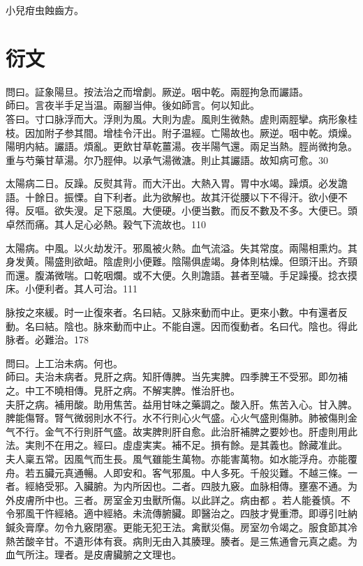 小兒疳虫蝕齒方。


\part{衍文}

問曰。証象陽旦。按法治之而增劇。厥逆。咽中乾。兩脛拘急而讝語。\\
師曰。言夜半手足当温。兩腳当伸。後如師言。何以知此。\\
答曰。寸口脉浮而大。浮{\khaaitp 則}为風。大{\khaaitp 則}为虗。風則生微熱。虗則兩脛攣。病形象桂枝。因加附子参其間。增桂令汗出。附子温經。亡陽故也。厥逆。咽中乾。煩燥。陽明内結。讝語。煩亂。更飲甘草乾薑湯。夜半陽气還。兩足当熱。脛尚微拘急。重与芍藥甘草湯。尔乃脛伸。以承气湯微溏。則止其讝語。故知病可愈。30

太陽病二日。反躁。反熨其背。而大汗出。大熱入胃。胃中水竭。躁煩。必发譫語。十餘日。振慄。自下利者。此为欲解也。故其汗從腰以下不得汗。欲小便不得。反嘔。欲失溲。足下惡風。大便硬。小便当數。而反不數及不多。大便已。頭卓然而痛。其人足心必熱。穀气下流故也。110

太陽病。中風。以火劫发汗。邪風被火熱。血气流溢。失其常度。兩陽相熏灼。其身发黄。陽盛則欲衄。陰虗{\khaaitp 則}小便難。陰陽俱虗竭。身体則枯燥。但頭汗出。齐頸而還。腹滿微喘。口乾咽爛。或不大便。久則譫語。甚者至噦。手足躁擾。捻衣摸床。小便利者。其人可治。111

脉按之來緩。时一止復來者。名曰結。又脉來動而中止。更來小數。中有還者反動。名曰結。陰也。脉來動而中止。不能自還。因而復動者。名曰代。陰也。得此脉者。必難治。178

問曰。上工治未病。何也。\\
師曰。夫治未病者。見肝之病。知肝傳脾。当先実脾。四季脾王不受邪。即勿補之。中工不曉相傳。見肝之病。不解実脾。惟治肝也。\\
夫肝之病。補用酸。助用焦苦。益用甘味之藥調之。酸入肝。焦苦入心。甘入脾。脾能傷腎。腎气微弱則水不行。水不行則心火气盛。心火气盛則傷肺。肺被傷則金气不行。金气不行則肝气盛。故実脾則肝自愈。此治肝補脾之要妙也。肝虛則用此法。実則不在用之。經曰。虛虛実実。補不足。損有餘。是其義也。餘藏准此。\\
夫人稟五常。因風气而生長。風气雖能生萬物。亦能害萬物。如水能浮舟。亦能覆舟。若五臟元真通暢。人即安和。客气邪風。中人多死。千般災難。不越三條。一者。經絡受邪。入臟腑。为内所因也。二者。四肢九竅。血脉相傳。壅塞不通。为外皮膚所中也。三者。房室金刃虫獸所傷。以此詳之。病由都{\sungtpii 𥁞}。若人能養慎。不令邪風干忤經絡。適中經絡。未流傳腑臟。即醫治之。四肢才覺重滯。即導引吐納鍼灸膏摩。勿令九竅閉塞。更能无犯王法。禽獸災傷。房室勿令竭之。服食節其冷熱苦酸辛甘。不遺形体有衰。病則无由入其腠理。腠者。是三焦通會元真之處。为血气所注。理者。是皮膚臟腑之文理也。



%
